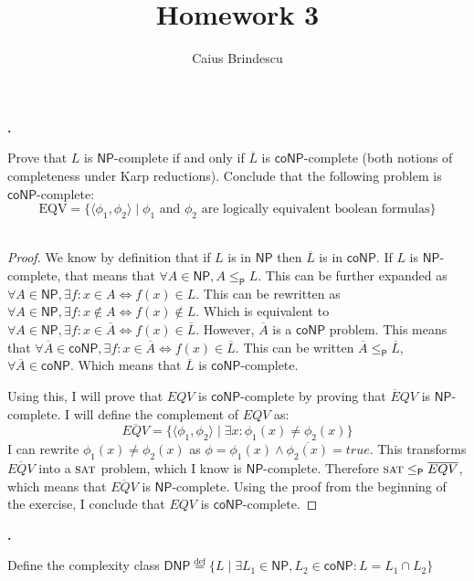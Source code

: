 \documentclass[letterpaper,11pt]{article}
\title{Homework 3}
\author{Caius Brindescu}
\newcommand{\cc}[1]{\ensuremath{\textsf{#1}}\xspace}
\newcommand{\NP}{\cc{NP}}
\newcommand{\coNP}{\cc{coNP}}
\newcommand{\karp}{\le_{\textsf{P}}}
\newcommand{\prob}[1]{\ensuremath{\textsc{#1}}\xspace}
\newcommand{\SAT}{\prob{sat}}
\newcounter{problem}
\newenvironment{problem}%
{%
	\stepcounter{problem}%
	\textbf{\theproblem.}
	\large
}{\normalsize~\\}%
\begin{document}
\maketitle

\begin{problem}
Prove that $L$ is $\NP$-complete if and only if $\overline L$ is $\coNP$-complete (both notions of completeness under Karp reductions). Conclude that the following problem is $\coNP$-complete:
\[
    \mbox{EQV} = \{ \langle \phi_1, \phi_2 \rangle \mid \phi_1 \mbox{ and } \phi_2 \mbox{ are logically equivalent boolean formulas} \}
\]
\end{problem}

\begin{proof}

We know by definition that if $L$ is in $\NP$ then $\overline L$ is in $\coNP$.
If $L$ is $\NP$-complete, that means that $\forall A \in \NP, A \karp L$.
This can be further expanded as $\forall A \in \NP, \exists f : x \in A \iff f(x) \in L$.
This can be rewritten as $\forall A \in \NP, \exists f : x \notin A \iff f(x) \notin L$.
Which is equivalent to $\forall A \in \NP, \exists f : x \in {\overline A} \iff f(x) \in {\overline L}$.
However, $\overline A$ is a $\coNP$ problem.
This means that $\forall {\overline A} \in \coNP, \exists f:x \in {\overline A} \iff f(x) \in {\overline L}$.
This can be written ${\overline A} \karp {\overline L}$, $\forall {\overline A} \in \coNP$.
Which means that $\overline L$ is $\coNP$-complete.

Using this, I will prove that $EQV$ is $\coNP$-complete by proving that $\overline EQV$ is $\NP$-complete.
I will define the complement of $EQV$ as:
\[
	\overline{EQV} = \{ \langle \phi_1, \phi_2 \rangle \mid \exists x : \phi_1 (x) \neq \phi_2 (x) \}
\]
I can rewrite $\phi_1 (x) \neq \phi_2 (x)$ as $\phi = \phi_1 (x) \wedge \overline{\phi_2 (x) }=true$.
This transforms $\overline{EQV}$ into a $\SAT$ problem, which I know is $\NP$-complete.
Therefore $\SAT \karp \overline{EQV}$, which means that $\overline{EQV}$ is $\NP$-complete.
Using the proof from the beginning of the exercise, I conclude that $EQV$ is $\coNP$-complete.
\end{proof}

\newcommand{\DNP}{\cc{DNP}}
\begin{problem}
Define the complexity class
$
    \cc{DNP} \overset{\text{def}}= \{ L \mid \exists L_1 \in \NP, L_2 \in \coNP : L = L_1 \cap L_2 \}
$
\end{problem}
\end{document}
